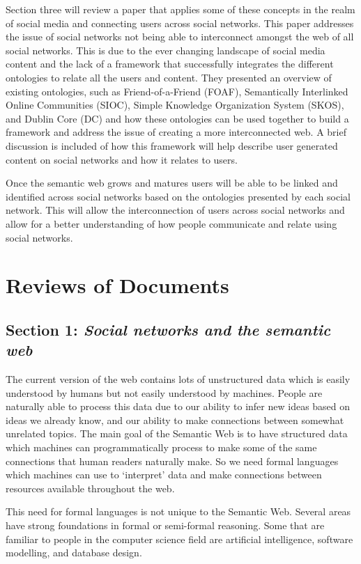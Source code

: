 \documentclass[10pt,journal,compsoc]{IEEEtran}
\begin{document}
Section three will review a paper that applies some of these concepts in the realm of social media and connecting users across social networks. This paper addresses the issue of social networks not being able to interconnect amongst the web of all social networks. This is due to the ever changing landscape of social media content and the lack of a framework that successfully integrates the different ontologies to relate all the users and content. They presented an overview of existing ontologies, such as Friend-of-a-Friend (FOAF), Semantically Interlinked Online Communities (SIOC), Simple Knowledge Organization System (SKOS), and Dublin Core (DC) and how these ontologies can be used together to build a framework and address the issue of creating a more interconnected web. A brief discussion is included of how this framework will help describe user generated content on social networks and how it relates to users.

Once the semantic web grows and matures users will be able to be linked and identified across social networks based on the ontologies presented by each social network. This will allow the interconnection of users across social networks and allow for a better understanding of how people communicate and relate using social networks.


\section{Reviews of Documents}
\subsection{Section 1: \textit{Social networks and the semantic web} \cite{_social_2007}}
The current version of the web contains lots of unstructured data which is easily understood by humans but not easily understood by machines.  People are naturally able to process this data due to our ability to infer new ideas based on ideas we already know, and our ability to make connections between somewhat unrelated topics.  The main goal of the Semantic Web is to have structured data which machines can programmatically  process  to make some of the same connections that human readers naturally make.  So we need formal languages which machines can use to ‘interpret’ data and make connections between resources available throughout the web.

This need for formal languages is not unique to the Semantic Web.  Several areas have strong foundations in formal or semi-formal reasoning.  Some that are familiar to people in the computer science field are artificial intelligence, software modelling, and  database design.
\end{document}
